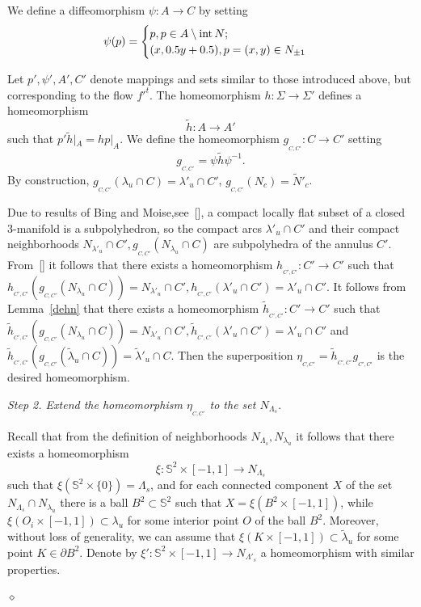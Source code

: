 \documentclass[%
 aip,
 amsmath,amssymb,
preprint,%
]{revtex4-1}
\newenvironment{proof}{{\bf Proof:}}
{\hfill $\diamond$\medskip}
\begin{document}
\begin{proof}
We define a diffeomorphism $\psi: A\to C$ by setting
\begin{equation}
\psi(p)=\begin{cases}p, p\in A\setminus {\rm int}\, N;\cr
(x, 0.5y+0.5), p=(x,y)\in N_{\pm 1}
\end{cases}
\end{equation}

Let $p',\psi', A', C'$ denote  mappings and sets similar to those introduced above, but corresponding to the flow ${f'}^t$. The homeomorphism $h: \Sigma\to \Sigma'$ defines a homeomorphism $$\tilde h: A\to A'$$ such that $p'\tilde h|_A=h p|_{A}$. We define the homeomorphism $g_{_{C,C'}}: C\to C'$ setting  $$g_{_{C,C'}}=\psi\tilde h\psi^{-1}.$$ By construction, $g_{_{C,C'}}(\lambda_u\cap C)=\lambda'_u\cap C'$, $g_{_{C,C'}}(N_c)=\widetilde N'_c$.

Due to  results of Bing and Moise,see~[], a compact locally flat subset of a closed 3-manifold is a subpolyhedron, so the compact arcs $\lambda'_u\cap C'$ and their compact neighborhoods $N_{\lambda'_u}\cap C', g_{_{C,C'}}(N_{\lambda_u}\cap C)$ are subpolyhedra of the annulus  $C'$. From~[] it follows that there exists a homeomorphism $h_{_{C', C'}}: C'\to C'$ such that $h_{_{C',C'}}(g_{_{C,C'}}(N_{\lambda_u}\cap C))=N_{\lambda'_u}\cap C', h_{_{C',C'}}(\lambda'_u\cap C')=\lambda'_u\cap C'$. It follows from Lemma~\ref{dehn} that there exists a homeomorphism $\tilde h_{_{C', C'}}: C'\to C'$ such that $\tilde h_{_{C',C'}}(g_{_{C,C'}}(N_{\lambda_u}\cap C))=N_{\lambda'_u}\cap C', \tilde h_{_{C',C'}}(\lambda'_u\cap C')=\lambda'_u\cap C'$ and $\tilde h_{_{C', C'}}(g_{_{C,C'}}(\tilde \lambda_u\cap C))=\tilde \lambda'_u\cap C$. Then the superposition $\eta_{_{C,C'}}=\tilde h_{_{C', C'}}g_{_{C', C'}}$ is the desired homeomorphism.

{\it Step 2. Extend the homeomorphism $\eta_{_{C,C'}}$ to the set $N_{\Lambda_s}$}.

Recall that from the definition of neighborhoods $N_{\Lambda_s}, N_{\lambda_u}$ it follows that there exists a homeomorphism $$\xi: \mathbb S^2\times [-1,1]\to N_{\Lambda_s}$$ such that $\xi(\mathbb S^2\times\{0\})=\Lambda_s$, and for each connected component $X$ of the set $N_{\Lambda_s}\cap N_{\lambda_u}$ there is a ball $B^2\subset\mathbb S^2$ such that $X=\xi(B^2\times [-1,1])$, while $\xi(O_i\times [-1,1])\subset \lambda_u$ for some interior point $O$ of the ball $B^2$. Moreover, without loss of generality, we can assume that $\xi(K\times [-1,1])\subset \widetilde \lambda_u$ for some point $K\in \partial B^2$. Denote by $\xi': \mathbb S^2\times [-1,1]\to N_{\Lambda'_s}$ a homeomorphism with similar properties.


\end{proof}
\end{document}
